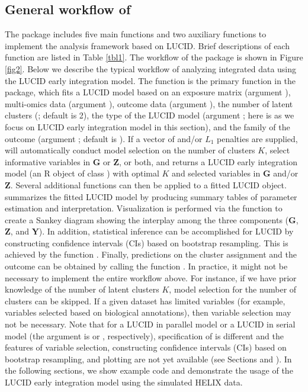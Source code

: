 \subsection{General workflow of } \label{sec2.2}
The  package includes five main functions and two auxiliary functions to implement the analysis framework based on LUCID. Brief descriptions of each function are listed in Table \ref{tbl1}. The workflow of the  package is shown in Figure \ref{fig2}. Below we describe the typical workflow of analyzing integrated data using the LUCID early integration model.
The function  is the primary function in the package, which fits a LUCID model based on an exposure matrix (argument ), multi-omics data (argument ), outcome data (argument ), the number of latent clusters (; default is 2), the type of the LUCID model (argument ; here is  as we focus on LUCID early integration model in this section), and the family of the outcome (argument ; default is ). If a vector of  and/or $L_1$ penalties are supplied,  will automatically conduct model selection on the number of clusters $K$, select informative variables in $\bm G$ or $\bm Z$,  or both, and returns a LUCID early integration model (an R object of class ) with optimal $K$ and selected variables in $\bm G$ and/or $\bm Z$. Several additional functions can then be applied to a fitted LUCID object.  summarizes the fitted LUCID model by producing summary tables of parameter estimation and interpretation. Visualization is performed via the  function to create a Sankey diagram showing the interplay among the three components ($\bm G$, $\bm Z$, and $\bm Y$). In addition, statistical inference can be accomplished for LUCID by constructing confidence intervals (CIs) based on bootstrap resampling. This is achieved by the function . Finally, predictions on the cluster assignment and the outcome can be obtained by calling the function . In practice, it might not be necessary to implement the entire workflow above. For instance, if we have prior knowledge of the number of latent clusters $K$, model selection for the number of clusters can be skipped. If a given dataset has limited variables (for example, variables selected based on biological annotations), then variable selection may not be necessary. Note that for a LUCID in parallel model or a LUCID in serial model (the argument  is  or , respectively), specification of  is different and the features of variable selection, constructing confidence intervals (CIs) based on bootstrap resampling, and plotting are not yet available (see Sections  and ).
In the following sections, we show example code and demonstrate the usage of the LUCID early integration model using the simulated HELIX data.
